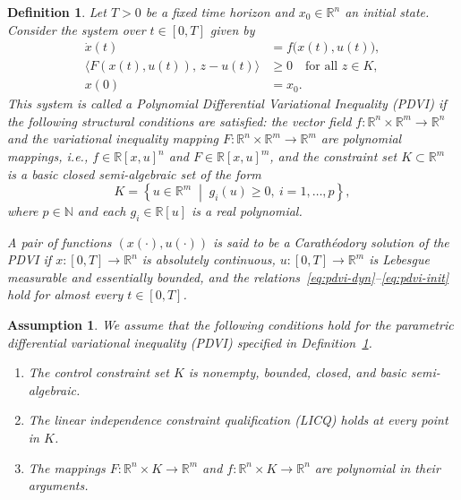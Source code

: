 \documentclass[10pt,a4paper]{amsart}
\newtheorem{definition}{Definition}
\newtheorem{assumption}{Assumption}
\begin{document}
\begin{definition}
\label{def:pdvi}
Let $T > 0$ be a fixed time horizon and $x_0 \in \mathbb{R}^n$ an initial state. Consider the system over $t \in [0, T]$ given by
\begin{subequations}\label{eq:pdvi-system}
\begin{align}
    \dot{x}(t) &= f\big(x(t), u(t)\big), \label{eq:pdvi-dyn} \\
    \langle F(x(t), u(t)),\, z - u(t) \rangle &\geq 0 \quad \text{for all } z \in K, \label{eq:pdvi-vi} \\
    x(0) &= x_0. \label{eq:pdvi-init}
\end{align}
\end{subequations}
This system is called a \emph{Polynomial Differential Variational Inequality} (PDVI) if the following structural conditions are satisfied: the vector field $f : \mathbb{R}^n \times \mathbb{R}^m \to \mathbb{R}^n$ and the variational inequality mapping $F : \mathbb{R}^n \times \mathbb{R}^m \to \mathbb{R}^m$ are polynomial mappings, i.e., $f \in \mathbb{R}[x, u]^n$ and $F \in \mathbb{R}[x, u]^m$, and the constraint set $K \subset \mathbb{R}^m$ is a basic closed semi-algebraic set of the form
\[
    K = \left\{ u \in \mathbb{R}^m \;\middle|\; g_i(u) \geq 0,\ i = 1, \dots, p \right\},
\]
where $p \in \mathbb{N}$ and each $g_i \in \mathbb{R}[u]$ is a real polynomial.

A pair of functions $(x(\cdot), u(\cdot))$ is said to be a \emph{Carath\'{e}odory solution} of the PDVI if $x : [0, T] \to \mathbb{R}^n$ is absolutely continuous, $u : [0, T] \to \mathbb{R}^m$ is Lebesgue measurable and essentially bounded, and the relations~\eqref{eq:pdvi-dyn}--\eqref{eq:pdvi-init} hold for almost every $t \in [0, T]$.
\end{definition}

\begin{assumption} \label{ass:core}
We assume that the following conditions hold for the parametric differential variational inequality (PDVI) specified in Definition~\ref{def:pdvi}.
\begin{enumerate}[label=\textup{(A\arabic*)}, widest=(A3), left=0pt, align=left]
    \item The control constraint set $K$ is nonempty, bounded, closed, and basic semi-algebraic.

    \item The linear independence constraint qualification (LICQ) holds at every point in $K$.

    \item The mappings $F \colon \mathbb{R}^n \times K \to \mathbb{R}^m$ and $f \colon \mathbb{R}^n \times K \to \mathbb{R}^n$ are polynomial in their arguments.
\end{enumerate}
\end{assumption}
\end{document}
